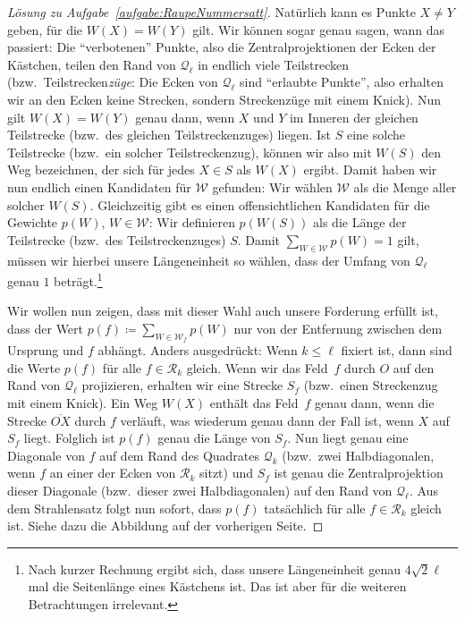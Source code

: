 \begin{proof}[Lösung zu Aufgabe~\ref{aufgabe:RaupeNummersatt}]
	Natürlich kann es Punkte $X\neq Y$ geben, für die $W(X)=W(Y)$ gilt. Wir können sogar genau sagen, wann das passiert: Die \enquote{verbotenen} Punkte, also die Zentralprojektionen der Ecken der Kästchen, teilen den Rand von $\mathcal Q_\ell$ in endlich viele Teilstrecken (bzw.\ Teilstrecken\emph{züge}: Die Ecken von $\mathcal Q_\ell$ sind \enquote{erlaubte Punkte}, also erhalten wir an den Ecken keine Strecken, sondern Streckenzüge mit einem Knick). Nun gilt $W(X)=W(Y)$ genau dann, wenn $X$ und $Y$ im Inneren der gleichen Teilstrecke (bzw.\ des gleichen Teilstreckenzuges) liegen. Ist $S$ eine solche Teilstrecke (bzw.\ ein solcher Teilstreckenzug), können wir
	also mit $W(S)$ den Weg bezeichnen, der sich für jedes $X\in S$ als $W(X)$ ergibt. Damit haben wir nun endlich einen Kandidaten für $\mathcal W$ gefunden: Wir wählen $\mathcal W$ als die Menge aller solcher $W(S)$. Gleichzeitig gibt es einen offensichtlichen Kandidaten für die Gewichte $p(W)$, $W\in \mathcal W$: Wir definieren $p(W(S))$ als die Länge der Teilstrecke (bzw.\ des Teilstreckenzuges) $S$. Damit $\sum_{W\in \mathcal W}p(W)=1$ gilt, müssen wir hierbei unsere Längeneinheit so wählen, dass der Umfang von $\mathcal Q_\ell$ genau $1$ beträgt.\footnote{Nach kurzer Rechnung ergibt sich, dass unsere Längeneinheit genau $4\sqrt{2}\ell$ mal die Seitenlänge eines Kästchens ist. Das ist aber für die weiteren Betrachtungen irrelevant.}
	
	Wir wollen nun zeigen, dass mit dieser Wahl auch unsere Forderung erfüllt ist, dass der Wert $p(f)\coloneqq \sum_{W\in\mathcal W_f}p(W)$ nur von der Entfernung zwischen dem Ursprung und $f$ abhängt. Anders ausgedrückt: Wenn $k\leqslant \ell$ fixiert ist, dann sind die Werte $p(f)$ für alle $f\in \mathcal R_k$ gleich. Wenn wir das Feld~$f$ durch $O$ auf den Rand von $\mathcal Q_\ell$ projizieren, erhalten wir eine Strecke $S_f$ (bzw.\ einen Streckenzug mit einem Knick). Ein Weg $W(X)$ enthält das Feld~$f$ genau dann, wenn die Strecke $\overline{OX}$ durch $f$ verläuft, was wiederum genau dann der Fall ist, wenn $X$ auf $S_f$ liegt. Folglich ist $p(f)$ genau die Länge von $S_f$. Nun liegt genau eine Diagonale von $f$ auf dem Rand des Quadrates $\mathcal Q_k$ (bzw.\ zwei Halbdiagonalen, wenn $f$ an einer der Ecken von $\mathcal R_k$ sitzt) und $S_f$ ist genau die Zentralprojektion dieser Diagonale (bzw.\ dieser zwei Halbdiagonalen) auf den Rand von $\mathcal Q_\ell$. Aus dem Strahlensatz folgt nun sofort, dass $p(f)$ tatsächlich für alle $f\in \mathcal R_k$ gleich ist. Siehe dazu die Abbildung auf der vorherigen Seite.
	

\end{proof}
